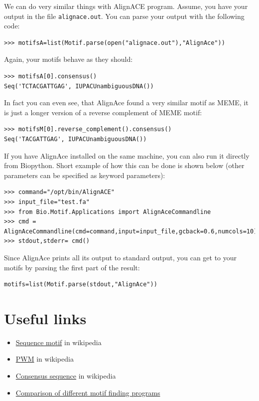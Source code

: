 \documentclass{report}
\begin{document}
We can do very similar things with AlignACE program. Assume, you have
your output in the file \verb|alignace.out|. You can parse your output
with the following code:

\begin{verbatim}
>>> motifsA=list(Motif.parse(open("alignace.out"),"AlignAce"))
\end{verbatim}

Again, your motifs behave as they should:
\begin{verbatim}
>>> motifsA[0].consensus()
Seq('TCTACGATTGAG', IUPACUnambiguousDNA())
\end{verbatim}

In fact you can even see, that AlignAce found a very similar motif as
MEME, it is just a longer version of a reverse complement of MEME
motif:
\begin{verbatim}
>>> motifsM[0].reverse_complement().consensus()
Seq('TACGATTGAG', IUPACUnambiguousDNA())
\end{verbatim}

If you have AlignAce installed on the same machine, you can also run
it directly from Biopython. Short example of how this can be done is
shown below (other parameters can be specified as keyword parameters):

\begin{verbatim}
>>> command="/opt/bin/AlignACE"
>>> input_file="test.fa"
>>> from Bio.Motif.Applications import AlignAceCommandline
>>> cmd = AlignAceCommandline(cmd=command,input=input_file,gcback=0.6,numcols=10)
>>> stdout,stderr= cmd()
\end{verbatim}

Since AlignAce prints all its output to standard output, you can get
to your motifs by parsing the first part of the result:
\begin{verbatim}
motifs=list(Motif.parse(stdout,"AlignAce"))
\end{verbatim}



\section{Useful links }
\label{sec:links}


\begin{itemize}
\item \href{http://en.wikipedia.org/wiki/Sequence_motif}{Sequence motif} in wikipedia
\item \href{http://en.wikipedia.org/wiki/Position_weight_matrix}{PWM} in wikipedia
\item \href{http://en.wikipedia.org/wiki/Consensus_sequence}{Consensus sequence} in wikipedia
\item \href{http://bio.cs.washington.edu/assessment/}{Comparison of different motif finding programs} 
\end{itemize}
\end{document}
